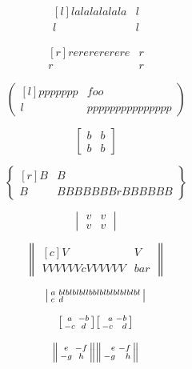 \documentclass{article}
\begin{document}
\[
\begin{matrix*}[l]
lalalalalala & l \\
l & l
\end{matrix*}
\]

\[
\begin{matrix*}[r]
rererererere & r \\
r & r
\end{matrix*}
\]

\[
\begin{pmatrix*}[l]
ppppppp & foo \\
l & ppppppppppppppp
\end{pmatrix*}
\]

\[
\begin{bmatrix*}
b & b \\
b & b
\end{bmatrix*}
\]

\[
\begin{Bmatrix*}[r]
B & B \\
B & BBBBBBBrBBBBBB
\end{Bmatrix*}
\]

\[
\begin{vmatrix*}
v & v \\
v & v
\end{vmatrix*}
\]

\[
\begin{Vmatrix*}[c]
V & V \\
VVVVVVcVVVVVV & bar
\end{Vmatrix*}
\]

\[
\begin{vsmallmatrix*}[l]
a & blblblbllbblblblblblblbl \\
c & d
\end{vsmallmatrix*}
\]

\[
\begin{bsmallmatrix} a & -b \\ -c & d \end{bsmallmatrix}
\begin{bsmallmatrix*}[r] a & -b \\ -c & d \end{bsmallmatrix*}
\]

\[
\begin{Vsmallmatrix} e & -f \\ -g & h \end{Vsmallmatrix}
\begin{Vsmallmatrix*}[r] e & -f \\ -g & h \end{Vsmallmatrix*}
\]
\end{document}

